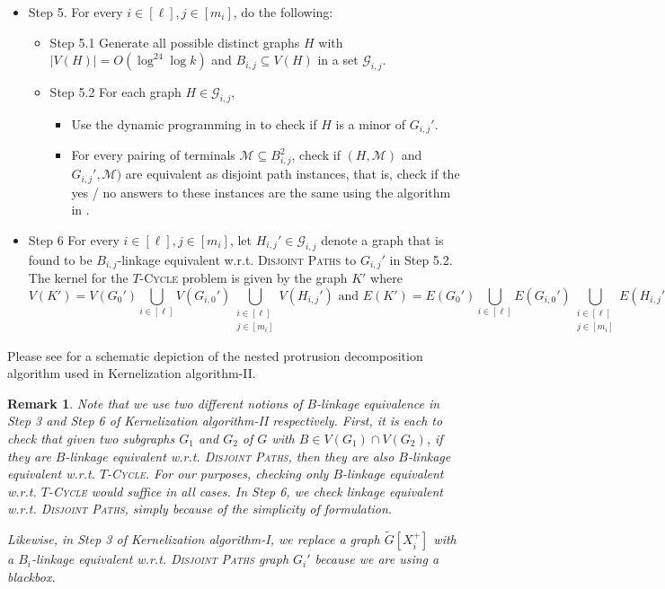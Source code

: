 \documentclass{article}
\newtheorem{remark}[theorem]{Remark}
\numberwithin{claimcounter}{lemma}
\newcommand{\tcycle}{$T$-\textsc{Cycle}\xspace}
\newcommand{\dispaths}{\textsc{Disjoint Paths}\xspace}
\begin{document}
\begin{itemize}
\item Step 5. For every $i \in [\ell], j\in [m_i]$, do the following:
\begin{itemize}
    \item Step 5.1 Generate all possible distinct graphs $H$ with $|V(H)| = O(\log^{24} \log k)$ and $B_{i,j} \subseteq V(H)$ in a set $\mathcal{G}_{i,j}$.
    \item Step 5.2 For each graph $H \in \mathcal{G}_{i,j}$,
    \begin{itemize}
        \item Use the dynamic programming in \cite{adlerone,adlertwo} to check if $H$ is a minor of $G_{i,j}'$.
        \item For every pairing of terminals $\mathcal{M}\subseteq B_{i,j}^2$, check if $(H,\mathcal{M})$ and $G_{i,j}',\mathcal{M})$ are equivalent as disjoint path instances, that is, check if the yes / no answers to these instances are the same using the algorithm in \cite{cho2023parameterized}. 
    \end{itemize}

\end{itemize}

    \item Step 6 For every $i \in [\ell], j\in [m_i]$, let $H_{i,j}' \in \mathcal{G}_{i,j}$ denote a graph that is found to be $B_{i,j}$-linkage equivalent w.r.t. \dispaths to $G_{i,j}'$ in Step 5.2.
    The kernel for the \tcycle problem is given by the graph $K'$ where 
    \[ V(K') = V(G_0') \bigcup_{i\in [\ell]} V(G_{i,0}') \bigcup_{\substack{i\in [\ell] \\ j\in [m_i]}} V(H_{i,j}') \text{ and }  E(K') = E(G_0') \bigcup_{i\in [\ell]} E(G_{i,0}') \bigcup_{\substack{i\in [\ell] \\ j\in [m_i]}} E(H_{i,j}'). \]
\end{itemize}  

Please see  for a schematic depiction of the nested protrusion decomposition algorithm used in {\sc Kernelization algorithm-II}.  

\begin{remark}
    Note that we use two different notions of $B$-linkage equivalence in Step 3 and Step 6 of {\sc Kernelization algorithm-II} respectively. First, it is each to check that given two  subgraphs $G_1$ and $G_2$ of $G$ with $B \in V(G_1) \cap V(G_2)$, if they  are $B$-linkage equivalent w.r.t. \dispaths, then they are also $B$-linkage equivalent w.r.t. \tcycle. For our purposes, checking only $B$-linkage equivalent w.r.t. \tcycle would suffice in all cases. In Step 6, we check linkage equivalent w.r.t. \dispaths, simply because of the simplicity of formulation.

    Likewise, in Step 3 of {\sc Kernelization algorithm-I}, we replace a graph $\tilde{G}[X_i^+]$ with a $B_i$-linkage equivalent w.r.t. \dispaths graph $G_i'$ because we are using a blackbox. 
\end{remark}
\end{document}
